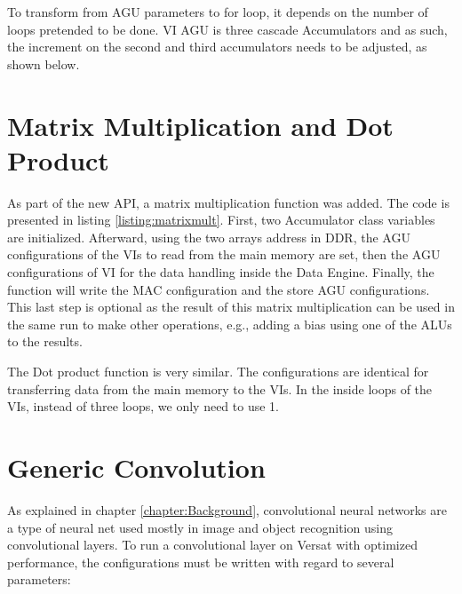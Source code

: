 

To transform from AGU parameters to for loop, it depends on the number of loops pretended to be done. VI AGU is three  cascade Accumulators
and as such, the increment on the second and third accumulators needs to be adjusted, as shown below.



\section{Matrix Multiplication and Dot Product}

As part of the new API, a matrix multiplication function was added. The code is presented in listing \ref{listing:matrixmult}. First, two Accumulator class variables are initialized.
Afterward, using the two arrays address in DDR, the AGU configurations of the VIs to read from the main memory are set, then the AGU configurations of VI for the data handling inside the Data Engine.
Finally, the function will write the MAC configuration and the store AGU configurations. This last step is optional as the result of this matrix multiplication can be used in the same run
to make other operations, e.g., adding a bias using one of the ALUs to the results.



The Dot product function is very similar. The configurations are identical for transferring data from the main memory to the VIs. In the inside loops of the VIs, instead of three  loops, we only need to use 
1.

\section{Generic Convolution}

As explained in chapter \ref*{chapter:Background}, convolutional neural networks are a type of neural net  
used mostly in image and object recognition using convolutional layers. To run a convolutional layer on Versat with
optimized performance, the configurations must be written with regard to several parameters:

